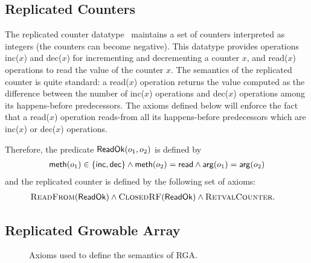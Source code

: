 \subsection{Replicated Counters}\label{ssec:counter}


The replicated counter datatype~\cite{DBLP:journals/eatcs/ShapiroPBZ11} maintains a set of counters interpreted as integers (the counters can become negative). This datatype provides  operations {\sf inc}($x$) and {\sf dec}($x$) for incrementing and decrementing a counter $x$, and {\sf read}($x$) operations to read the value of the counter $x$. The semantics of the replicated counter is quite standard: a {\sf read}($x$) operation returns the value computed as the difference between the number of {\sf inc}($x$) operations and {\sf dec}($x$) operations among its happens-before predecessors. The axioms defined below will enforce the fact that a {\sf read}($x$) operation reads-from all its happens-before predecessors which are {\sf inc}($x$) or {\sf dec}($x$) operations.

Therefore, the predicate ${\sf ReadOk}(o_1,o_2)$ is defined by
\begin{align*}
{\sf meth}(o_1) \in \{{\sf inc},{\sf dec}\} \land {\sf meth}(o_2) ={\sf read} \land {\sf arg}(o_1)= {\sf arg}(o_2)
\end{align*}
and the replicated counter is defined by the following set of axioms:
\begin{align*}
&\textsc{ReadFrom}({\sf ReadOk})\land \textsc{ClosedRF}({\sf ReadOk})\land \textsc{RetvalCounter}.
\end{align*}

\subsection{Replicated Growable Array}

\begin{figure}[t]
  \footnotesize
  
  \vspace{-2em}
  \caption{Axioms used to define the semantics of RGA.}
  \label{fig:formulas:RGA}
  \vspace{-2em}
\end{figure}

